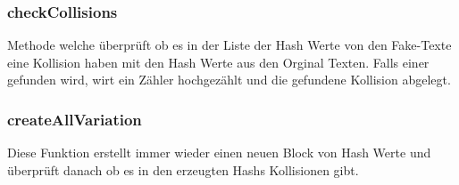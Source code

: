 \documentclass[12pt]{scrartcl}
\begin{document}
\subsubsection{checkCollisions}
Methode welche überprüft ob es in der Liste der Hash Werte von den Fake-Texte eine Kollision haben mit den Hash Werte aus den Orginal Texten. Falls einer gefunden wird, wirt ein Zähler hochgezählt und die gefundene Kollision abgelegt.

\subsubsection{createAllVariation}
Diese Funktion erstellt immer wieder einen neuen Block von Hash Werte und überprüft danach ob es in den erzeugten Hashs Kollisionen gibt.
 
 
\end{document}
